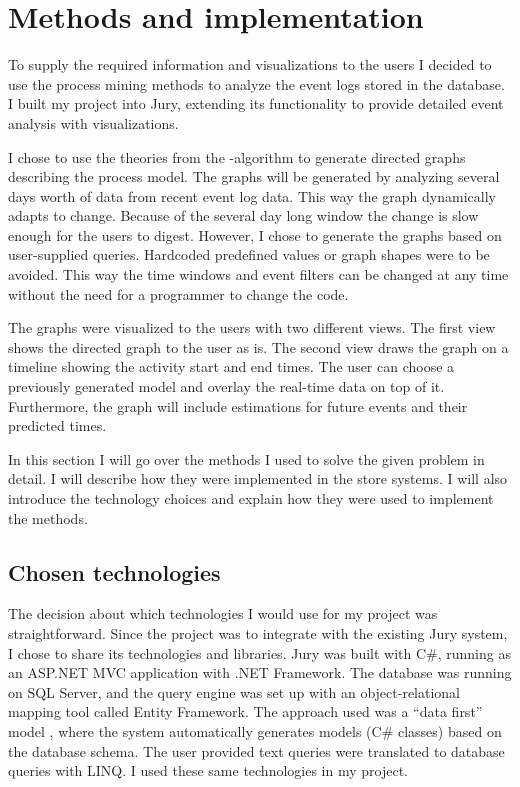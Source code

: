 
\clearpage
\section{Methods and implementation}

To supply the required information and visualizations to the users I decided to use the process mining methods to analyze the event logs stored in the database.
I built my project into Jury, extending its functionality to provide detailed event analysis with visualizations.

I chose to use the theories from the \textalpha-algorithm to generate directed graphs describing the process model.
The graphs will be generated by analyzing several days worth of data from recent event log data. 
This way the graph dynamically adapts to change. 
Because of the several day long window the change is slow enough for the users to digest. 
However, I chose to generate the graphs based on user-supplied queries.
Hardcoded predefined values or graph shapes were to be avoided.
This way the time windows and event filters can be changed at any time without the need for a programmer to change the code.

The graphs were visualized to the users with two different views. 
The first view shows the directed graph to the user as is. 
The second view draws the graph on a timeline showing the activity start and end times.
The user can choose a previously generated model and overlay the real-time data on top of it.
Furthermore, the graph will include estimations for future events and their predicted times.

In this section I will go over the methods I used to solve the given problem in detail.
I will describe how they were implemented in the store systems.
I will also introduce the technology choices and explain how they were used to implement the methods.

\subsection{Chosen technologies}

The decision about which technologies I would use for my project was straightforward.
Since the project was to integrate with the existing Jury system, I chose to share its technologies and libraries.
Jury was built with C\#, running as an ASP.NET MVC application with .NET Framework.
The database was running on SQL Server, and the query engine was set up with an object-relational mapping tool called Entity Framework. 
The approach used was a ``data first'' model , where the system automatically generates models (C\# classes) based on the database schema. 
The user provided text queries were translated to database queries with LINQ. 
I used these same technologies in my project.

